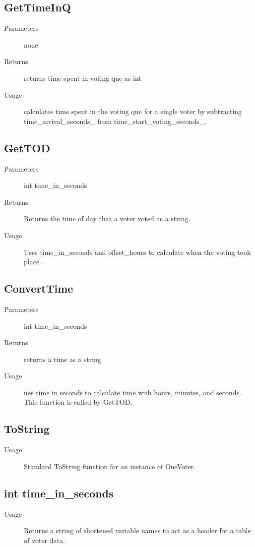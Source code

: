 \subsection{GetTimeInQ}
\begin{description}
\item[Parameters] none
\item[Returns] returns time spent in voting que as int
\item[Usage] calculates time spent in the voting que for a single voter by subtracting time\_arrival\_seconds\_ from time\_start\_voting\_seconds\_.
\end{description}

\subsection{GetTOD}
\begin{description}
\item[Parameters] int time\_in\_seconds
\item[Returns] Returns the time of day that a voter voted as a string.
\item[Usage] Uses time\_in\_seconds and offset\_hours to calculate when the voting took place.
\end{description}

\subsection{ConvertTime}
\begin{description}
\item[Parameters] int time\_in\_seconds
\item[Returns] returns a time as a string
\item[Usage] ues time in seconds to calculate time with hours, minutes, and seconds.  This function is called by GetTOD.
\end{description}

\subsection{ToString}
\begin{description}
\item[Usage] Standard ToString function for an instance of OneVoter.
\end{description}

\subsection{int time\_in\_seconds}
\begin{description}
\item[Usage] Returns a string of shortened variable names to act as a header for a table of voter data.
\end{description}

